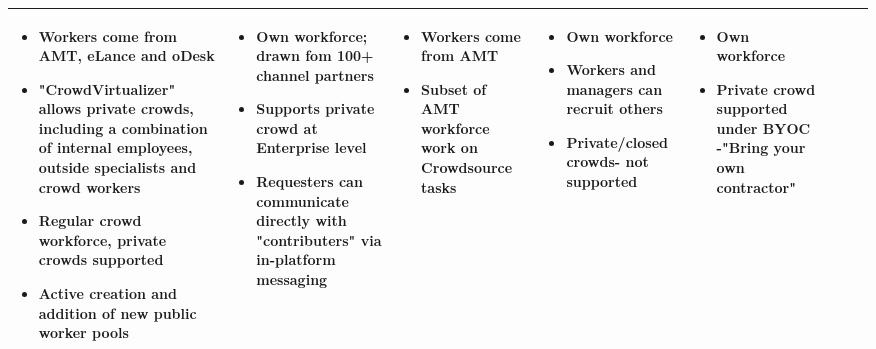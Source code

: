 \documentclass{sigchi}
\begin{document}
\begin{sidewaystable*}
\begin{tabular}[h]{| p{1.5cm}| p{2.7cm}| p{2.7cm}| p{2.7cm}| p{2.7cm}| p{2.7cm}| p{2.7cm}| p{2.7cm}|}
{
\begin{itemize} [noitemsep,nolistsep]
\item Workers come from AMT, eLance and oDesk
\item "CrowdVirtualizer" allows private crowds, including a combination of internal employees, outside specialists and crowd workers
\item Regular crowd workforce, private crowds supported
\item Active creation and addition of new public worker pools
\end{itemize}
} &

{
\begin{itemize} [noitemsep,nolistsep]
\item Own workforce; drawn fom 100+ channel partners
\item Supports private crowd at Enterprise level
\item Requesters can communicate directly with "contributers" via in-platform messaging
\end{itemize}
} &

{
\begin{itemize} [noitemsep,nolistsep]
\item Workers come from AMT
\item Subset of AMT workforce work on Crowdsource tasks
\end{itemize}
} &

{
\begin{itemize} [noitemsep,nolistsep]
\item Own workforce 
\item Workers and managers can recruit others
\item Private/closed crowds- not supported
\end{itemize}
} &

{
\begin{itemize} [noitemsep,nolistsep]
\item Own workforce
\item Private crowd supported under BYOC -"Bring your own contractor"
\end{itemize}

} \\ 
\hline




\end{tabular}
\end{sidewaystable*}
\end{document}
